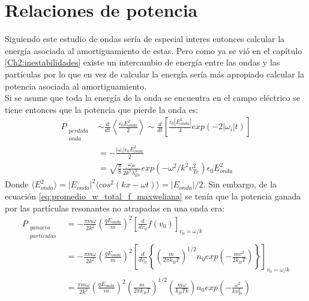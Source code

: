 \documentclass[../tesis_main_file.tex]{subfile}
\begin{document}
\section{Relaciones de potencia}
Siguiendo este estudio de ondas sería de especial interes entonces calcular la energía asociada al amortiguamiento de estas.
Pero como ya se vió en el capítulo \ref{Ch2:inestabilidades} existe un intercambio de energía entre las ondas  y las partículas por lo que en vez de calcular la energía sería más apropiado calcular la potencia asociada al amortiguamiento.\\
Si se asume que toda la energía de la onda se encuentra en el campo eléctrico se tiene entonces que la potencia que pierde la onda es:
\begin{equation}
\label{eq:potencia_perdida-onda_Landau}
\begin{split}
P_{\substack{perdida\\onda}}&\sim\frac{d}{dt}\left\langle \frac{\epsilon_0 E^2_{onda}}{2}\right\rangle \sim \frac{d}{dt}\left[\frac{\epsilon_0|E^2_{onda}|}{4}exp(-2|\omega_i|t)\right]\\
&=-\frac{|\omega_i|\epsilon_0 E^2_{onda}}{2}\\
&=\sqrt{\frac{\pi}{8}}\frac{\omega_{pe}}{2k^3\lambda^3_{De}}exp\left(-\omega^2/k^2v^2_{Te}\right)\epsilon_0 E^2_{onda}
\end{split}
\end{equation}
Donde $\langle E^2_{onda}\rangle =|E_{onda}|^2\langle cos^2(kx-\omega t)\rangle =|E_{onda}|/2$. Sin embargo, de la ecuación \ref{eq:promedio_w_total_f_maxweliana} se tenía que la potencia ganada por las partículas resonantes no atrapadas en una onda era:
\begin{equation}
\label{eq:P_ganada_particulas_Landau}
\begin{split}
P_{\substack{ganacia\\particulas} } &=-\frac{\pi m \omega }{2k^2} \left( \frac{q E_{onda}}{m} \right) ^2 \left[ \frac{d}{dv_0}f(v_0) \right]_{v_0=\omega / k} \\
&=-\frac{\pi m \omega}{2k^2}\left( \frac{qE_{onda}}{m} \right)^2 \left[\frac{d}{dv_0} \left\lbrace \left(\frac{m}{2\pi k_BT} \right)^{1/2}n_0 exp\left( -\frac{mv^2}{2k_BT}\right) \right\rbrace \right]_{v_0= \omega /k}\\
&=\frac{\pi m \omega}{2k^2}\left(\frac{qE_{onda}}{m}\right)^2 \left( \frac{m}{2\pi k_BT} \right)^{1/2}\left( \frac{m \omega}{k_BTk}\right)n_0 exp \left(-\frac{\omega^2}{kv^2_{Te}}\right)
\end{split}
\end{equation}
\end{document}
